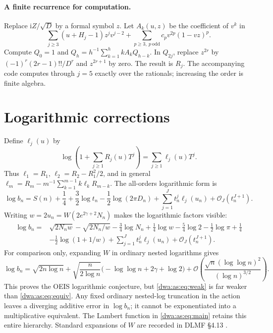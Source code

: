 \documentclass[11pt,letterpaper]{article}
\numberwithin{equation}{section}
\theoremstyle{remark}
\newcommand{\ii}{\mathrm i}
\newcommand{\OO}{\mathcal O}
\begin{document}
\paragraph{A finite recurrence for computation.}
Replace $\ii Z/\sqrt D$ by a formal symbol $z$. Let $A_k(u,z)$ be the coefficient of $v^k$ in
\[
 \sum_{j\ge3}(u+H_j-1)z^jv^{j-2}
 +\sum_{p\ge3,\ p\ \mathrm{odd}}c_pv^{2p}(1-vz)^p.
\]
Compute $Q_0=1$ and $Q_h=h^{-1}\sum_{k=1}^h kA_kQ_{h-k}$. In $Q_{2j}$, replace $z^{2r}$ by $(-1)^r(2r-1)!!/D^r$ and $z^{2r+1}$ by zero. The result is $R_j$. The accompanying code computes through $j=5$ exactly over the rationals; increasing the order is finite algebra.

\section{Logarithmic corrections}
Define $\ell_j(u)$ by
\begin{equation}\label{dwa:as:eq:ell}
 \log\left(1+\sum_{j\ge1}R_j(u)T^j\right)=\sum_{j\ge1}\ell_j(u)T^j.
\end{equation}
Thus $\ell_1=R_1$, $\ell_2=R_2-R_1^2/2$, and in general
$\ell_m=R_m-m^{-1}\sum_{k=1}^{m-1}k\ell_kR_{m-k}$. The all-orders logarithmic form is
\begin{equation}\label{dwa:as:eq:logall}
 \log b_n=S(n)+\frac14+\frac32\log t_n-\frac12\log(2\pi D_n)
 +\sum_{j=1}^Jt_n^j\ell_j(u_n)+\OO_J(t_n^{J+1}).
\end{equation}
Writing $w=2u_n=W(2e^{2\gamma+2}N_n)$ makes the logarithmic factors visible:
\begin{align}\label{dwa:as:eq:logw}
 \log b_n={}&\sqrt{2N_nw}-\sqrt{2N_n/w}-\frac34\log N_n
 +\frac14\log w-\frac54\log2-\frac12\log\pi+\frac14\nonumber\\
 &-\frac12\log(1+1/w)+\sum_{j=1}^Jt_n^j\ell_j(u_n)
 +\OO_J(t_n^{J+1}).
\end{align}
For comparison only, expanding $W$ in ordinary nested logarithms gives
\begin{equation}\label{dwa:as:eq:weak}
 \log b_n=\sqrt{2n\log n}
 +\sqrt{\frac{n}{2\log n}}\bigl(-\log\log n+2\gamma+\log2\bigr)
 +\OO\left(\frac{\sqrt n(\log\log n)^2}{(\log n)^{3/2}}\right).
\end{equation}
This proves the OEIS logarithmic conjecture, but \eqref{dwa:as:eq:weak} is far weaker than \eqref{dwa:as:eq:equiv}. Any fixed ordinary nested-log truncation in the action leaves a diverging additive error in $\log b_n$; it cannot be exponentiated into a multiplicative equivalent. The Lambert function in \eqref{dwa:as:eq:main} retains this entire hierarchy. Standard expansions of $W$ are recorded in DLMF \S4.13 \cite{DLMF}.
\end{document}
